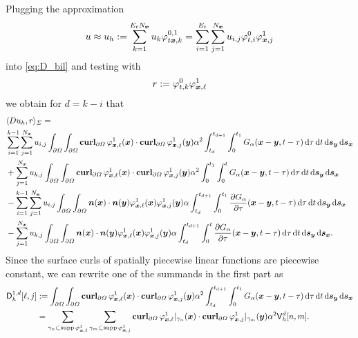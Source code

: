 \documentclass[a4paper,11pt]{article}
\begin{document}
Plugging the approximation
\begin{equation*}
 u \approx u_h := \sum_{k=1}^{E_t N_{{\bm{x}}}} u_k \varphi^{0,1}_{t{{\bm{x}}},k} = \sum_{i=1}^{E_t} \sum_{j=1}^{N_{{\bm{x}}}} u_{i,j} \varphi^0_{t,i} \varphi^1_{{{\bm{x}}},j}
\end{equation*}
into \eqref{eq:D_bil} and testing with
\begin{equation*}
  r := \varphi^0_{t,k} \varphi^1_{{{\bm{x}}},\ell}
\end{equation*}
we obtain for $d=k-i$ that
\begin{align*}
  &\langle Du_h, r \rangle_\Sigma = \\ 
  &\sum_{i=1}^{k-1} \sum_{j=1}^{N_{{\bm{x}}}} u_{i,j}\int_{\partial\Omega} \int_{\partial\Omega} \operatorname{\mathbf{curl}}_{\partial\Omega} \varphi^1_{{{\bm{x}}},\ell}({{\bm{x}}}) \cdot \operatorname{\mathbf{curl}}_{\partial\Omega} \varphi^1_{{{\bm{x}}},j}({{\bm{y}}}) \alpha^2 \int_{t_{d}}^{t_{d+1}} \int_{0}^{t_1} G_\alpha({{\bm{x}}}-{{\bm{y}}},t-\tau) \,{\mathrm{d}}\tau \,{\mathrm{d}} t \,{\mathrm{d}}{{\bm{s}}}_{{\bm{y}}} \,{\mathrm{d}}{{\bm{s}}}_{{\bm{x}}} \\
    &+\sum_{j=1}^{N_{{\bm{x}}}} u_{k,j}\int_{\partial\Omega} \int_{\partial\Omega} \operatorname{\mathbf{curl}}_{\partial\Omega} \varphi^1_{{{\bm{x}}},\ell}({{\bm{x}}}) \cdot \operatorname{\mathbf{curl}}_{\partial\Omega} \varphi^1_{{{\bm{x}}},j}({{\bm{y}}}) \alpha^2 \int_{0}^{t_1} \int_{0}^{t} G_\alpha({{\bm{x}}}-{{\bm{y}}},t-\tau) \,{\mathrm{d}}\tau \,{\mathrm{d}} t \,{\mathrm{d}}{{\bm{s}}}_{{\bm{y}}} \,{\mathrm{d}}{{\bm{s}}}_{{\bm{x}}} \\
  &- \sum_{i=1}^{k-1} \sum_{j=1}^{N_{{\bm{x}}}} u_{i,j} \int_{\partial\Omega} \int_{\partial\Omega} {{\bm{n}}}({{\bm{x}}}) \cdot {\ensuremath{{\bm{n}}}}({{\bm{y}}}) \varphi^1_{{{\bm{x}}},\ell}({{\bm{x}}}) \varphi^1_{{{\bm{x}}},j}({{\bm{y}}}) \alpha \int_{t_d}^{t_{d+1}} \int_0^{t_1} \frac{\partial G_\alpha}{\partial \tau}({{\bm{x}}}-{{\bm{y}}},t-\tau) \,{\mathrm{d}}\tau \,{\mathrm{d}} t \,{\mathrm{d}}{{\bm{s}}}_{{\bm{y}}} \,{\mathrm{d}}{{\bm{s}}}_{{\bm{x}}} \\
    &- \sum_{j=1}^{N_{{\bm{x}}}} u_{k,j} \int_{\partial\Omega} \int_{\partial\Omega} {{\bm{n}}}({{\bm{x}}}) \cdot {\ensuremath{{\bm{n}}}}({{\bm{y}}}) \varphi^1_{{{\bm{x}}},\ell}({{\bm{x}}}) \varphi^1_{{{\bm{x}}},j}({{\bm{y}}}) \alpha \int_{t_d}^{t_{d+1}} \int_0^{t} \frac{\partial G_\alpha}{\partial \tau}({{\bm{x}}}-{{\bm{y}}},t-\tau) \,{\mathrm{d}}\tau \,{\mathrm{d}} t \,{\mathrm{d}}{{\bm{s}}}_{{\bm{y}}} \,{\mathrm{d}}{{\bm{s}}}_{{\bm{x}}}.
\end{align*}
Since the surface curls of spatially piecewise linear functions are piecewise constant, we can rewrite one of the summands in the first part as
\begin{align*}
  {\ensuremath{{\mathsf{D}}}}^{1,d}_h[\ell,j] &:= \int_{\partial\Omega} \int_{\partial\Omega}\operatorname{\mathbf{curl}}_{\partial\Omega} \varphi^1_{{{\bm{x}}},\ell}({{\bm{x}}}) \cdot \operatorname{\mathbf{curl}}_{\partial\Omega} \varphi^1_{{{\bm{x}}},j}({{\bm{y}}}) \alpha^2 \int_{t_{d}}^{t_{d+1}} \int_{0}^{t_1} G_\alpha({{\bm{x}}}-{{\bm{y}}},t-\tau) \,{\mathrm{d}}\tau \,{\mathrm{d}} t \,{\mathrm{d}}{{\bm{s}}}_{{\bm{y}}} \,{\mathrm{d}}{{\bm{s}}}_{{\bm{x}}} \\
  &= \sum_{\gamma_n \subset \operatorname{supp} \varphi^1_{{{\bm{x}}},\ell}} \sum_{\gamma_m \subset \operatorname{supp} \varphi^1_{{{\bm{x}}},j}} \operatorname{\mathbf{curl}}_{\partial\Omega} \varphi^1_{{{\bm{x}}},\ell}|_{\gamma_n}({{\bm{x}}}) \cdot \operatorname{\mathbf{curl}}_{\partial\Omega} \varphi^1_{{{\bm{x}}},j}|_{\gamma_m}({{\bm{y}}}) \alpha^2 {{\mathsf{V}}}_h^d[n,m].
\end{align*}
\end{document}

